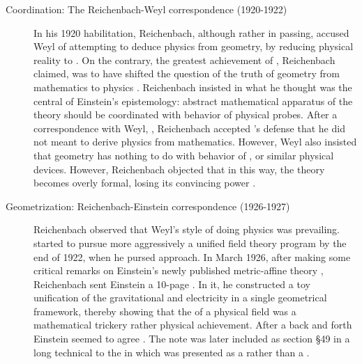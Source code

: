 \documentclass[draft]{article}
\newcommand{\PRZL}{\citetitle{Reichenbach1928}\xspace}
\begin{document}
\begin{description}
\item[Coordination: The Reichenbach-Weyl correspondence (1920-1922)]\label{reichenbachweyl} In his 1920 habilitation, Reichenbach, although rather in passing, accused Weyl of attempting to deduce physics from geometry, by reducing physical reality to  \citep[73]{Reichenbach1920a}. On the contrary, the greatest achievement of \gr, Reichenbach claimed, was to have shifted the question of the truth of geometry from mathematics to physics \citep[73]{Reichenbach1920a}. Reichenbach insisted in what he thought was the central of Einstein's epistemology: abstract mathematical apparatus of the theory should be coordinated with behavior of physical probes. After a  correspondence with Weyl, \citet[367--368]{Reichenbach1921}, Reichenbach accepted 's defense that he did not meant to derive physics from mathematics. However, Weyl also insisted that \spti geometry has nothing to do with behavior of \rac, or similar physical devices. However, Reichenbach objected that in this way, the theory becomes overly formal, losing its convincing power \citep[367]{Reichenbach1921}.

\item[Geometrization: Reichenbach-Einstein correspondence (1926-1927)]\label{reichenbacheinsteinI} Reichenbach observed that Weyl's style of doing physics was prevailing.  started to pursue more aggressively a unified field theory program by the end of 1922, when he pursed  approach. In March 1926, after making some critical remarks on Einstein's newly published metric-affine theory \citep{Einstein1925a}, Reichenbach sent Einstein a 10-page  \citep{Reichenbach1926f}. In it, he constructed a toy unification of the gravitational and electricity in a single geometrical framework, thereby showing that the  of a physical field was a mathematical trickery rather physical achievement. After a back and forth Einstein seemed to agree \citep{Lehmkuhl2014}. The note was later included as section \S49 in a long technical \Ap to the \PRZL \citep[-50]{Reichenbach1928} in which \gr was presented as a  rather than a  \citep{Giovanelli2020}. 


\end{description}
\end{document}
